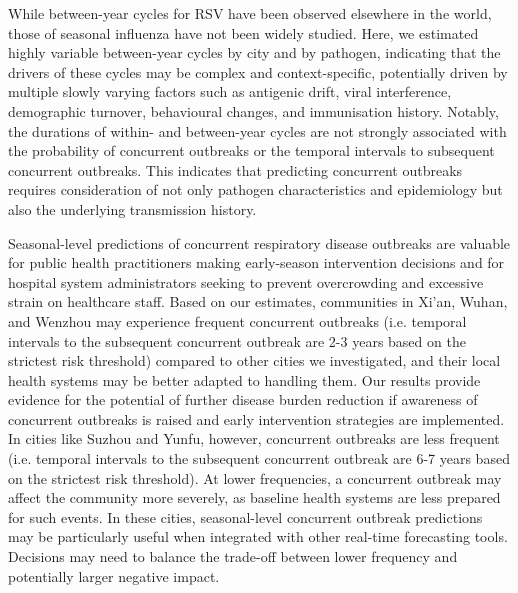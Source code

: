 While between-year cycles for RSV have been observed elsewhere in the world, those of seasonal influenza have not been widely studied.
Here, we estimated highly variable between-year cycles by city and by pathogen, indicating that the drivers of these cycles may be complex and context-specific, potentially driven by multiple slowly varying factors such as antigenic drift, viral interference, demographic turnover, behavioural changes, and immunisation history. 
Notably, the durations of within- and between-year cycles are not strongly associated with the probability of concurrent outbreaks or the temporal intervals to subsequent concurrent outbreaks. 
This indicates that predicting concurrent outbreaks requires consideration of not only pathogen characteristics and epidemiology but also the underlying transmission history.


Seasonal-level predictions of concurrent respiratory disease outbreaks are valuable for public health practitioners making early-season intervention decisions and for hospital system administrators seeking to prevent overcrowding and excessive strain on healthcare staff.
Based on our estimates, communities in Xi'an, Wuhan, and Wenzhou may experience frequent concurrent outbreaks (i.e. temporal intervals to the subsequent concurrent outbreak are 2-3 years based on the strictest risk threshold) compared to other cities we investigated, and their local health systems may be better adapted to handling them.
Our results provide evidence for the potential of further disease burden reduction if awareness of concurrent outbreaks is raised and early intervention strategies are implemented.
In cities like Suzhou and Yunfu, however, concurrent outbreaks are less frequent (i.e. temporal intervals to the subsequent concurrent outbreak are 6-7 years based on the strictest risk threshold).
At lower frequencies, a concurrent outbreak may affect the community more severely, as baseline health systems are less prepared for such events.
In these cities, seasonal-level concurrent outbreak predictions may be particularly useful when integrated with other real-time forecasting tools.
Decisions may need to balance the trade-off between lower frequency and potentially larger negative impact.

